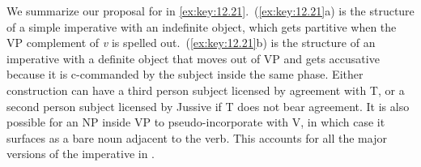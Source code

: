 \documentclass[output=paper]{langsci/langscibook}
\begin{document}
We summarize our proposal for   in
\eqref{ex:key:12.21}.~(\ref{ex:key:12.21}a) is the structure of a simple
imperative with an indefinite object, which gets partitive when the VP
complement of \emph{v}\textsubscript{\Imp} is spelled
out.~(\ref{ex:key:12.21}b) is the structure of an imperative with a definite
object that moves out of VP and gets accusative because it is c-commanded by
the subject inside the same phase.  Either construction can have a
third person subject licensed by agreement with T, or a second person subject
licensed by Jussive if T does not bear agreement.  It is also possible for an NP
inside VP to pseudo-incorporate with V, in which case it surfaces as a bare
noun adjacent to the verb.  This accounts for all the major versions of the
imperative in .
\end{document}
